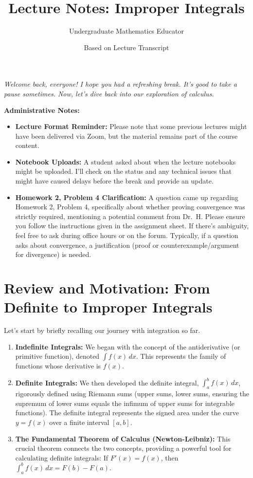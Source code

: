 \documentclass[11pt]{article}
\title{Lecture Notes: Improper Integrals}
\author{Undergraduate Mathematics Educator} %
\date{Based on Lecture Transcript} %
\theoremstyle{definition}
\newenvironment{adminnote}{%
    \begin{framed}\noindent\textbf{Administrative Notes:}\begin{itemize}}{%
    \end{itemize}\end{framed}}
\newcommand{\dx}{\, dx} %
\begin{document}

\noindent\textit{Welcome back, everyone! I hope you had a refreshing break. It's good to take a pause sometimes. Now, let's dive back into our exploration of calculus.}

\begin{adminnote}
    \item \textbf{Lecture Format Reminder:} Please note that some previous lectures might have been delivered via Zoom, but the material remains part of the course content.
    \item \textbf{Notebook Uploads:} A student asked about when the lecture notebooks might be uploaded. I'll check on the status and any technical issues that might have caused delays before the break and provide an update.
    \item \textbf{Homework 2, Problem 4 Clarification:} A question came up regarding Homework 2, Problem 4, specifically about whether proving convergence was strictly required, mentioning a potential comment from Dr.\ H. Please ensure you follow the instructions given in the assignment sheet. If there's ambiguity, feel free to ask during office hours or on the forum. Typically, if a question asks about convergence, a justification (proof or counterexample/argument for divergence) is needed.
\end{adminnote}

\section{Review and Motivation: From Definite to Improper Integrals}

Let's start by briefly recalling our journey with integration so far.

\begin{enumerate}
    \item \textbf{Indefinite Integrals:} We began with the concept of the antiderivative (or primitive function), denoted $\int f(x) \dx$. This represents the family of functions whose derivative is $f(x)$.
    \item \textbf{Definite Integrals:} We then developed the definite integral, $\int_a^b f(x) \dx$, rigorously defined using Riemann sums (upper sums, lower sums, ensuring the supremum of lower sums equals the infimum of upper sums for integrable functions). The definite integral represents the signed area under the curve $y=f(x)$ over a finite interval $[a, b]$.
    \item \textbf{The Fundamental Theorem of Calculus (Newton-Leibniz):} This crucial theorem connects the two concepts, providing a powerful tool for calculating definite integrals: If $F'(x) = f(x)$, then $\int_a^b f(x) \dx = F(b) - F(a)$.
\end{enumerate}
\end{document}
